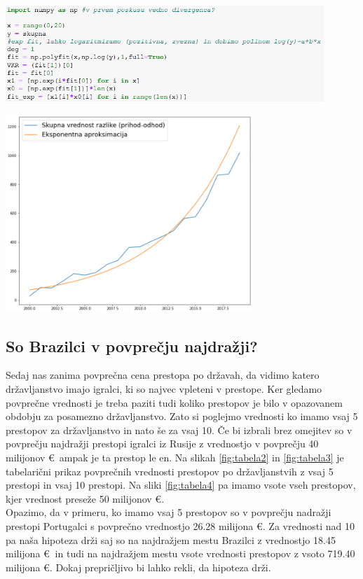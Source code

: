 \documentclass[a4paper, 12pt]{article}
\begin{document}
\begin{center}
\includegraphics[width=0.9\textwidth]{analiza3}
\label{fig:analiza3}

\includegraphics[width=0.7\textwidth]{graf7}
\label{fig:graf7}
\end{center}


\subsection{So Brazilci v povprečju najdražji?}
Sedaj nas zanima povprečna cena prestopa po državah, da vidimo katero državljanstvo imajo igralci, ki so najvec vpleteni v prestope. 
Ker gledamo povprečne vrednosti je treba paziti tudi koliko prestopov je bilo v opazovanem obdobju za posamezno državljanstvo. Zato si poglejmo vrednosti ko imamo vsaj 5 prestopov za državljanstvo in nato še za vsaj 10. Če bi izbrali brez omejitev so v povprečju najdražji prestopi igralci iz Rusije z vrednostjo v povprečju 40 milijonov \euro $\,$ ampak je ta prestop le en. Na slikah \ref{fig:tabela2} in \ref{fig:tabela3} je tabelarični prikaz povprečnih vrednosti prestopov po državljanstvih z vsaj 5 prestopi in vsaj 10 prestopi. Na sliki \ref{fig:tabela4} pa imamo vsote vseh prestopov, kjer vrednost preseže 50 milijonov \euro. 
\\
Opazimo, da v primeru, ko imamo vsaj 5 prestopov so v povprečju nadražji prestopi Portugalci s povprečno vrednostjo 26.28 milijona \euro. Za vrednosti nad 10 pa naša hipoteza drži saj so na najdražjem mestu Brazilci z vrednostjo 18.45 milijona \euro $\:$ in tudi na najdražjem mestu vsote vrednosti prestopov z vsoto 719.40 milijona \euro. Dokaj prepričljivo bi lahko rekli, da hipoteza drži.
\end{document}
